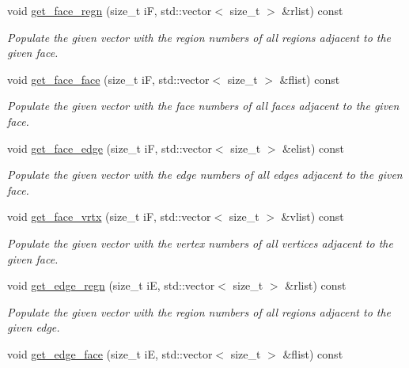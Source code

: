 \begin{DoxyCompactItemize}
void \hyperlink{classStemMesh3D_1_1mesh__3Dv_a77ba74ed0585df27c1d16b26d2a4caa0}{get\+\_\+face\+\_\+regn} (size\+\_\+t iF, std\+::vector$<$ size\+\_\+t $>$ \&rlist) const
\begin{DoxyCompactList}\small\item\em Populate the given vector with the region numbers of all regions adjacent to the given face. \end{DoxyCompactList}\item 
void \hyperlink{classStemMesh3D_1_1mesh__3Dv_ab505aac621d73bedfb3f7145ee857054}{get\+\_\+face\+\_\+face} (size\+\_\+t iF, std\+::vector$<$ size\+\_\+t $>$ \&flist) const
\begin{DoxyCompactList}\small\item\em Populate the given vector with the face numbers of all faces adjacent to the given face. \end{DoxyCompactList}\item 
void \hyperlink{classStemMesh3D_1_1mesh__3Dv_ae1cecbb86f79a41a6e979e6afc32be3f}{get\+\_\+face\+\_\+edge} (size\+\_\+t iF, std\+::vector$<$ size\+\_\+t $>$ \&elist) const
\begin{DoxyCompactList}\small\item\em Populate the given vector with the edge numbers of all edges adjacent to the given face. \end{DoxyCompactList}\item 
void \hyperlink{classStemMesh3D_1_1mesh__3Dv_a4a48a14ef16c33c441fff9dafd26989b}{get\+\_\+face\+\_\+vrtx} (size\+\_\+t iF, std\+::vector$<$ size\+\_\+t $>$ \&vlist) const
\begin{DoxyCompactList}\small\item\em Populate the given vector with the vertex numbers of all vertices adjacent to the given face. \end{DoxyCompactList}\item 
void \hyperlink{classStemMesh3D_1_1mesh__3Dv_ace07d45b45e79fd62e37530b6e5501c8}{get\+\_\+edge\+\_\+regn} (size\+\_\+t iE, std\+::vector$<$ size\+\_\+t $>$ \&rlist) const
\begin{DoxyCompactList}\small\item\em Populate the given vector with the region numbers of all regions adjacent to the given edge. \end{DoxyCompactList}\item 
void \hyperlink{classStemMesh3D_1_1mesh__3Dv_acfc3f5d372d82b08180391776e0e5b85}{get\+\_\+edge\+\_\+face} (size\+\_\+t iE, std\+::vector$<$ size\+\_\+t $>$ \&flist) const

\end{DoxyCompactItemize}
